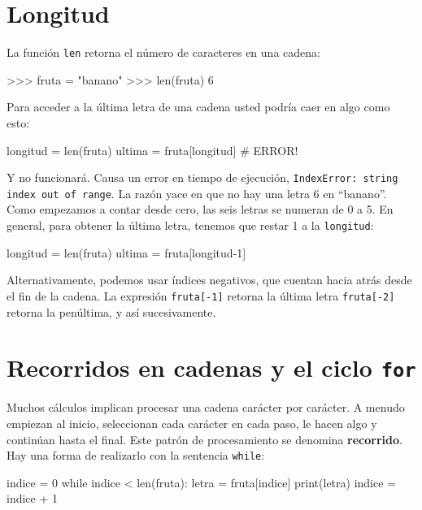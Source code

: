 
\section{Longitud}

 

La función \texttt{len} retorna el número de caracteres en una cadena:

\begin{pyconcode}
>>> fruta = "banano"
>>> len(fruta)
6
\end{pyconcode}
 Para acceder a la última letra de una cadena usted podría caer en
algo como esto:
\begin{pythoncode}
longitud = len(fruta)
ultima = fruta[longitud]       # ERROR!
\end{pythoncode}

Y no funcionará. Causa un error en tiempo de ejecución, \texttt{IndexError: string
index out of range}. La razón yace en que no hay una letra 6 en ``banano''.
Como empezamos a contar desde cero, las seis letras se numeran de
0 a 5. En general, para obtener la última letra, tenemos que restar
1 a la \texttt{longitud}:


\begin{pythoncode}
longitud = len(fruta)
ultima = fruta[longitud-1]
\end{pythoncode}

Alternativamente, podemos usar índices negativos, que cuentan hacia
atrás desde el fin de la cadena. La expresión \texttt{fruta{[}-1{]}}
retorna la última letra \texttt{fruta{[}-2{]}} retorna la penúltima,
y así sucesivamente.


\section{Recorridos en cadenas y el ciclo \texttt{for}}

\label{for} 

   

Muchos cálculos implican procesar una cadena carácter por carácter.
A menudo empiezan al inicio, seleccionan cada carácter en cada paso,
le hacen algo y continúan hasta el final. Este patrón de procesamiento
se denomina \textbf{recorrido}. Hay una forma de realizarlo con la
sentencia \texttt{while}:
\begin{pythoncode}
indice = 0
while indice < len(fruta):
  letra = fruta[indice]
  print(letra)
  indice = indice + 1
\end{pythoncode}

